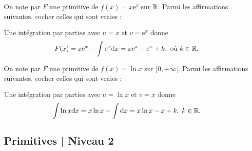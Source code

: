 \begin{question}
On note par $F$ une primitive de $f(x)=x\mathrm{e}^x$ sur $\mathbb{R}$. Parmi les affirmations suivantes, cocher celles qui sont vraies :
\begin{answers}  
\end{answers}
\begin{explanations}
Une intégration par parties avec $u=x$ et $v=\mathrm{e}^x$ donne
$$F(x)=x\mathrm{e}^x-\int \mathrm{e}^x\mathrm{d}x=x\mathrm{e}^x-\mathrm{e}^x+k,\mbox{ où }k\in \mathbb{R}.$$
\end{explanations}
\end{question}

\begin{question}
On note par $F$ une primitive de $f(x)=\ln x$ sur $]0,+\infty[$. Parmi les affirmations suivantes, cocher celles qui sont vraies :
\begin{answers}  
\end{answers}
\begin{explanations}
Une intégration par parties avec $u=\ln x$ et $v=x$ donne
$$\int \ln x\mathrm{d}x=x\ln x-\int \mathrm{d}x=x\ln x-x+k,\; k\in \mathbb{R}.$$
\end{explanations}
\end{question}

\subsection{Primitives | Niveau 2}

